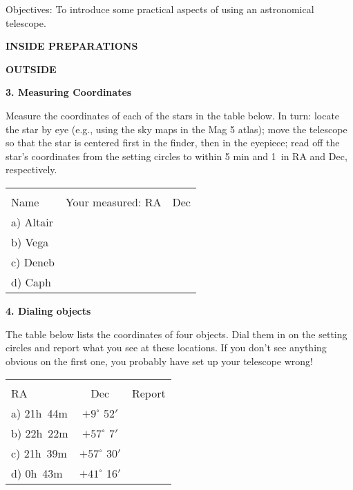 
\noindent
{Objectives:} To introduce some practical aspects of using an astronomical telescope.

\bigskip\noindent
{\bf INSIDE PREPARATIONS}



\clearpage
\noindent
{\bf OUTSIDE}

\bigskip\noindent
{\bf 3. Measuring Coordinates}

\medskip\noindent
Measure the coordinates of each of the stars in the table below. In
turn: locate the star by eye (e.g., using the sky maps in the Mag 5
atlas); move the telescope so that the star is centered first in the
finder, then in the eyepiece; read off the star's coordinates from the
setting circles to within 5 min and 1\deg\ in RA and Dec,
respectively.

\begin{center}
\begin{tabular}{lcc} \hline \\ [-6pt]
\hspace{1cm}Name\hspace{1cm} &  \hspace{1cm} Your measured:  RA \hspace{1cm} & Dec \\ [6pt]
\hline
a) Altair  & &     \\ \hline
b) Vega  & &  \\ \hline
c) Deneb  & &    \\ \hline
d) Caph  & &   \\ \hline
  \end{tabular}
\end{center}

\bigskip\noindent
{\bf 4. Dialing objects}

\bigskip\noindent The table below lists the coordinates of four
objects. Dial them in on the setting circles and report what you see
at these locations. If you don't see anything obvious on the first
one, you probably have set up your telescope wrong!

\begin{center}
\begin{tabular}{lcc} \hline \\ [-6pt]
 \hspace{1.5cm}  RA \hspace{1cm} & Dec \hspace{1cm}& \hspace{3cm}Report\hspace{3cm} \\ [6pt]
\hline
a) 21h~44m  & $+9^\circ$ 52$'$ &     \\ \hline %
b) 22h~22m  & $+57^\circ$ 7$'$ &     \\ \hline %
c) 21h~39m  & $+57^\circ$ 30$'$ &  \\ \hline %
d) 0h~43m   & $+41^\circ$ 16$'$ &    \\ \hline %
  \end{tabular}
\end{center}
